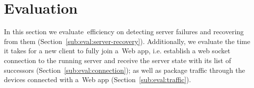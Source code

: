 \section{Evaluation}
\label{sec:evaluation}

In this section we evaluate~\APIName efficiency on detecting server failures and recovering from them (Section~\ref{sub:eval:server-recovery}).
Additionally, we evaluate the time it takes for a new client to fully join a~\APIName Web app, i.e. establish a web socket connection to the running server and receive the server state with its list of successors (Section~\ref{sub:eval:connection}); as well as package traffic through the devices connected with a~\APIName Web app (Section~\ref{sub:eval:traffic}).









